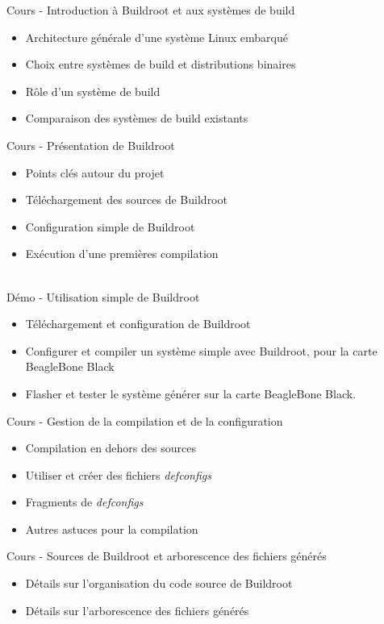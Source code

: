 \documentclass[a4paper,12pt,obeyspaces,spaces,hyphens]{article}
\begin{document}
\feagendatwocolumn
{Cours - Introduction à Buildroot et aux systèmes de build}
{
  \begin{itemize}
  \item Architecture générale d'une système Linux embarqué
  \item Choix entre systèmes de build et distributions binaires
  \item Rôle d'un système de build
  \item Comparaison des systèmes de build existants
  \end{itemize}
}
{Cours - Présentation de Buildroot}
{
  \begin{itemize}
  \item Points clés autour du projet
  \item Téléchargement des sources de Buildroot
  \item Configuration simple de Buildroot
  \item Exécution d'une premières compilation
  \end{itemize}
}
\\
\feagendatwocolumn
{Démo - Utilisation simple de Buildroot}
{
  \begin{itemize}
  \item Téléchargement et configuration de Buildroot
  \item Configurer et compiler un système simple avec Buildroot, pour la
        carte BeagleBone Black
  \item Flasher et tester le système générer sur la carte BeagleBone
        Black.
  \end{itemize}
}
{Cours - Gestion de la compilation et de la configuration}
{
  \begin{itemize}
  \item Compilation en dehors des sources
  \item Utiliser et créer des fichiers {\em defconfigs}
  \item Fragments de {\em defconfigs}
  \item Autres astuces pour la compilation
  \end{itemize}
}

\feagendaonecolumn
{Cours - Sources de Buildroot et arborescence des fichiers générés}
{
  \begin{itemize}
  \item Détails sur l'organisation du code source de Buildroot
  \item Détails sur l'arborescence des fichiers générés
  \end{itemize}
}
\end{document}
